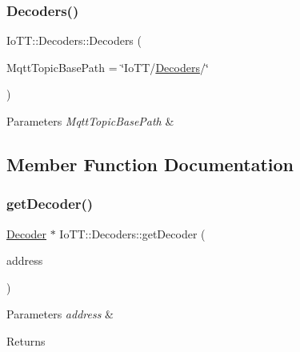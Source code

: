 \mbox{\label{classIoTT_1_1Decoders_a2fe2db78da99d037611b348fe5e2d682}} 
\subsubsection{\texorpdfstring{Decoders()}{Decoders()}}
{\footnotesize\ttfamily Io\+T\+T\+::\+Decoders\+::\+Decoders (\begin{DoxyParamCaption}\item[{const string \&}]{Mqtt\+Topic\+Base\+Path = {\ttfamily \char`\"{}IoTT/\hyperlink{classIoTT_1_1Decoders}{Decoders}/\char`\"{}} }\end{DoxyParamCaption})\hspace{0.3cm}{\ttfamily [protected]}}


\begin{DoxyParams}{Parameters}
{\em Mqtt\+Topic\+Base\+Path} & \\
\hline
\end{DoxyParams}


\subsection{Member Function Documentation}
\mbox{\label{classIoTT_1_1Decoders_af079a0dd22459e170cd35a8740a21261}} 
\subsubsection{\texorpdfstring{get\+Decoder()}{getDecoder()}}
{\footnotesize\ttfamily \hyperlink{classIoTT_1_1Decoder}{Decoder} $\ast$ Io\+T\+T\+::\+Decoders\+::get\+Decoder (\begin{DoxyParamCaption}\item[{const \hyperlink{namespaceIoTT_a31b8cd9473fc447b3fb341b78afa54fe}{D\+C\+C\+Address\+\_\+t} \&}]{address }\end{DoxyParamCaption})}


\begin{DoxyParams}{Parameters}
{\em address} & \\
\hline
\end{DoxyParams}
\begin{DoxyReturn}{Returns}

\end{DoxyReturn}
\mbox{\label{classIoTT_1_1Decoders_a23583534ca36cafd911eebbbf9a0a299}} 
